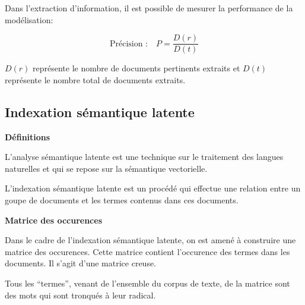 Dans l'extraction d'information,
il est possible de mesurer la performance de la modélisation:

\[
	\mbox{Précision :} \quad P = \frac{D(r)}{D(t)}
\]

$D(r)$ représente le nombre de documents pertinents extraits
et $D(t)$ représente le nombre total de documents extraits.

\subsection{Indexation sémantique latente}

{\bf Définitions}

L'analyse sémantique latente est une technique sur le traitement
des langues naturelles et qui se repose sur la sémantique vectorielle.

L'indexation sémantique latente est un procédé qui effectue une relation
entre un goupe de documents et les termes contenus dans ces documents.

{\bf Matrice des occurences}

Dans le cadre de l'indexation sémantique latente,
on est amené à construire une matrice des occurences.
Cette matrice contient l'occurence des termes dans les documents.
Il s'agit d'une matrice creuse.

Tous les ``termes'', venant de l'ensemble du corpus de texte,
de la matrice sont des mots qui sont tronqués à leur radical.
